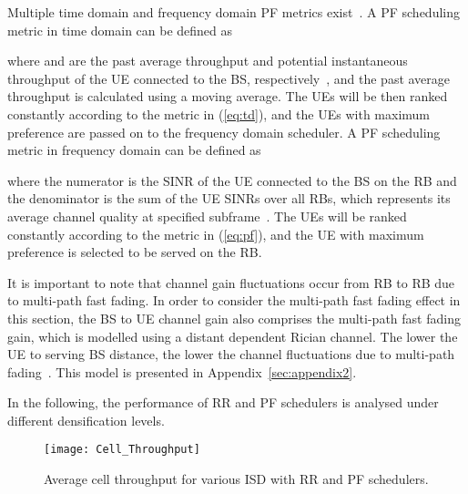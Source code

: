 \documentclass{IEEEtran}
\begin{document}
Multiple time domain and frequency domain \ac{PF} metrics exist~\cite{4526113}.
A \ac{PF} scheduling metric in time domain can be defined as

where  and  are the past average throughput and potential instantaneous throughput of the  \ac{UE} connected to the  \ac{BS}, respectively~\cite{4526113},
and the past average throughput is calculated using a moving average.
The \acp{UE} will be then ranked constantly according to the metric in (\ref{eq:td}),
and the  \acp{UE} with maximum preference are passed on to the frequency domain scheduler.
A \ac{PF} scheduling metric in frequency domain can be defined as

where the numerator  is the \ac{SINR} of the  \ac{UE} connected to the  \ac{BS} on the  \ac{RB}
and the denominator is the sum of the  UE SINRs over all \acp{RB},
which represents its average channel quality at specified subframe~\cite{4526113}.
The \acp{UE} will be ranked constantly according to the metric in (\ref{eq:pf}),
and the \ac{UE} with maximum preference is selected to be served on the  \ac{RB}.

It is important to note that channel gain fluctuations occur from \ac{RB} to \ac{RB} due to multi-path fast fading.
In order to consider the multi-path fast fading effect in this section,
the \ac{BS} to \ac{UE} channel gain   also comprises the multi-path fast fading gain,
which is modelled using a distant dependent Rician channel.
The lower the \ac{UE} to serving \ac{BS} distance,
the lower the channel fluctuations due to multi-path fading~\cite{2015Jafari}.
This model is presented in Appendix~\ref{sec:appendix2}.


In the following, the performance of \ac{RR} and \ac{PF} schedulers is analysed under different densification levels.

\begin{figure}[t]
	\centering
	\texttt{[image: Cell\_Throughput]}
	\caption{Average cell throughput for various \ac{ISD} with \ac{RR} and \ac{PF} schedulers.}
	\label{fig:cell_ov_thr}
\end{figure}
\end{document}
